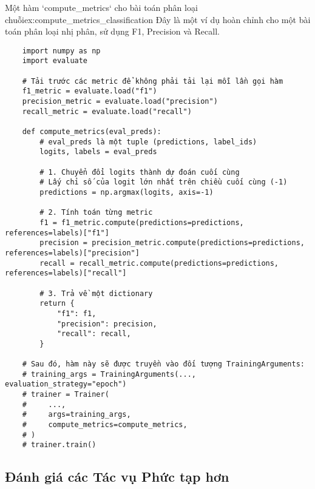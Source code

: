 \begin{example}{Một hàm `compute\_metrics` cho bài toán phân loại chuỗi}{ex:compute_metrics_classification}
    Đây là một ví dụ hoàn chỉnh cho một bài toán phân loại nhị phân, sử dụng F1, Precision và Recall.
    \begin{verbatim}
    import numpy as np
    import evaluate

    # Tải trước các metric để không phải tải lại mỗi lần gọi hàm
    f1_metric = evaluate.load("f1")
    precision_metric = evaluate.load("precision")
    recall_metric = evaluate.load("recall")

    def compute_metrics(eval_preds):
        # eval_preds là một tuple (predictions, label_ids)
        logits, labels = eval_preds
        
        # 1. Chuyển đổi logits thành dự đoán cuối cùng
        # Lấy chỉ số của logit lớn nhất trên chiều cuối cùng (-1)
        predictions = np.argmax(logits, axis=-1)
        
        # 2. Tính toán từng metric
        f1 = f1_metric.compute(predictions=predictions, references=labels)["f1"]
        precision = precision_metric.compute(predictions=predictions, references=labels)["precision"]
        recall = recall_metric.compute(predictions=predictions, references=labels)["recall"]
        
        # 3. Trả về một dictionary
        return {
            "f1": f1,
            "precision": precision,
            "recall": recall,
        }

    # Sau đó, hàm này sẽ được truyền vào đối tượng TrainingArguments:
    # training_args = TrainingArguments(..., evaluation_strategy="epoch")
    # trainer = Trainer(
    #     ...,
    #     args=training_args,
    #     compute_metrics=compute_metrics,
    # )
    # trainer.train()
    \end{verbatim}
\end{example}

\subsection{Đánh giá các Tác vụ Phức tạp hơn}
\label{ssec:complex_task_evaluation}

